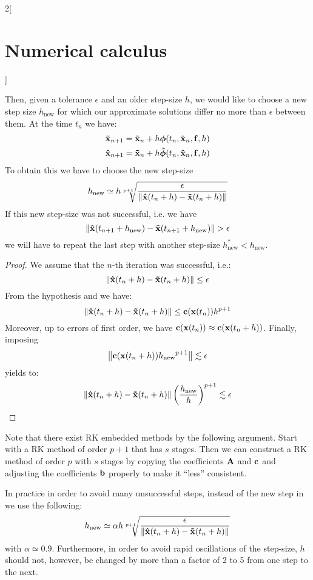 \documentclass[../../../main_math.tex]{subfiles}
\begin{document}
\begin{multicols}{2}[\section{Numerical calculus}]
\begin{theorem}
    Then, given a tolerance $\epsilon$ and an older step-size $h$, we would like to choose a new step size $h_\mathrm{new}$ for which our approximate solutions differ no more than $\epsilon$ between them. At the time $t_n$ we have:
    \begin{align*}
      \boldsymbol{\mathrm{\tilde{x}}}_{n+1} & =\boldsymbol{\mathrm{\tilde{x}}}_n+h\boldsymbol{\mathrm{\phi}}(t_n,\boldsymbol{\mathrm{\tilde{x}}}_n,\boldsymbol{\mathrm{f}},h)   \\
      \boldsymbol{\mathrm{\hat{x}}}_{n+1}   & =\boldsymbol{\mathrm{\tilde{x}}}_n+h\boldsymbol{\mathrm{\hat\phi}}(t_n,\boldsymbol{\mathrm{\hat{x}}}_n,\boldsymbol{\mathrm{f}},h)
    \end{align*}
    To obtain this we have to choose the new step-size
    \begin{equation}\label{NC:RFF}
      h_{\mathrm{new}}\simeq h\sqrt[p+1]{\frac{\epsilon}{\left\|\boldsymbol{\mathrm{\hat{x}}}(t_n+h)-\boldsymbol{\mathrm{\tilde{x}}}(t_n+h)\right\|}}
    \end{equation}
    If this new step-size was not successful, i.e. we have $$\norm{\vf{\hat{x}}(t_{n+1}+h_\mathrm{new})-\vf{\tilde{x}}(t_{n+1}+h_\mathrm{new})}>\epsilon$$ we will have to repeat the last step with another step-size $h_{\mathrm{new}}^*<h_{\mathrm{new}}$.
  \end{theorem}
  \begin{proof}
    We assume that the $n$-th iteration was successful, i.e.:
    $$\left\|\boldsymbol{\mathrm{\hat{x}}}(t_n+h)-\boldsymbol{\mathrm{\tilde{x}}}(t_n+h)\right\|\leq\epsilon$$
    From the hypothesis and  we have:
    $$\left\|\boldsymbol{\mathrm{\hat{x}}}(t_n+h)-\boldsymbol{\mathrm{\tilde{x}}}(t_n+h)\right\|\leq \boldsymbol{\mathrm{c}}(\boldsymbol{\mathrm{x}}(t_n))h^{p+1}$$
    Moreover, up to errors of first order, we have $\boldsymbol{\mathrm{c}}(\boldsymbol{\mathrm{x}}(t_n))\approx\boldsymbol{\mathrm{c}}(\boldsymbol{\mathrm{x}}(t_{n}+h))$. Finally, imposing
    $$\left\|\boldsymbol{\mathrm{c}}(\boldsymbol{\mathrm{x}}(t_{n}+h)){h_\mathrm{new}}^{p+1}\right\|\lesssim\epsilon$$
    yields to:
    $$\left\|\boldsymbol{\mathrm{\hat{x}}}(t_n+h)-\boldsymbol{\mathrm{\tilde{x}}}(t_n+h)\right\|{\left(\frac{h_{\mathrm{new}}}{h}\right)}^{p+1}\lesssim\epsilon$$
  \end{proof}
  \begin{remark}
    Note that there exist RK embedded methods by the following argument. Start with a RK method of order $p+1$ that has $s$ stages. Then we can construct a RK method of order $p$ with $s$ stages by copying the coefficients $\boldsymbol{\mathrm{A}}$ and $\boldsymbol{\mathrm{c}}$ and adjusting the coefficients $\boldsymbol{\mathrm{b}}$ properly to make it ``less'' consistent.
  \end{remark}
  \begin{remark}
    In practice in order to avoid many unsuccessful steps, instead of the new step in  we use the following:
    $$h_{\mathrm{new}}\simeq\alpha h\sqrt[p+1]{\frac{\epsilon}{\left\|\boldsymbol{\mathrm{\hat{x}}}(t_n+h)-\boldsymbol{\mathrm{\tilde{x}}}(t_n+h)\right\|}}$$
    with $\alpha\simeq 0.9$.
    Furthermore, in order to avoid rapid oscillations of the step-size, $h$ should not, however, be changed by more than a factor of 2 to 5 from one step to the next.
  \end{remark}

\end{multicols}
\end{document}
